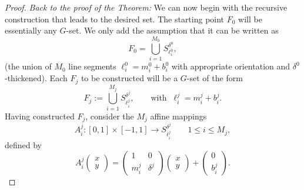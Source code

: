 \documentclass[11pt,a4paper]{amsart}
\begin{document}
\begin{proof}
{\em Back to the proof of the Theorem:} We   can now begin with the recursive construction that leads to the
desired set. The starting point $F_0$ will be essentially any $G$-set. We only add the assumption that it can be written as
\begin{equation*}
F_0=\bigcup_{i=1}^{M_0}S_{\ell_i^0}^{\delta^0},
\end{equation*}
(the union of $M_0$ line segments
$\ell^0_i=m^0_i+b^0_i$ with appropriate orientation and $\delta^0$-thickened). Each $F_j$
to be constructed will be a $G$-set of the form
\begin{equation*}
F_j:=\bigcup_{i=1}^{M_j}S_{\ell_i^j}^{\delta^j}, \qquad \text{
with } \ \ell^j_i=m^j_i+b^j_i.
\end{equation*}
 Having constructed $F_j$, consider the $M_j$ affine mappings
\begin{equation*}
A^j_i:[0,1]\times[-1,1]\rightarrow
S_{\ell^j_{i}}^{\delta^j}\qquad 1\le i\le M_j,
\end{equation*}
defined by
\begin{equation*}
  A^j_i\left(\begin{array}{c}
    x\\
    y
\end{array}\right)=\left(\begin{array}{cc}
    1 & 0\\
    m_i^j & \delta^j
\end{array}\right)\left(\begin{array}{c}
    x\\
    y
\end{array}\right)+\left(\begin{array}{c}
    0\\
    b^j_{i}
\end{array}\right).
\end{equation*}


\end{proof}
\end{document}
